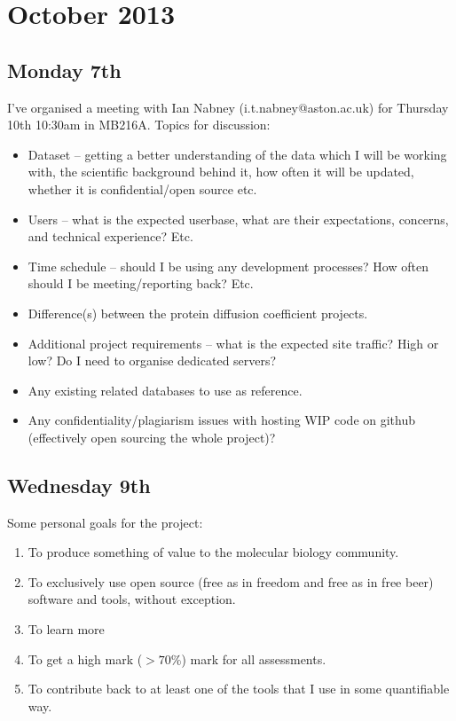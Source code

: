 \section{October 2013 \hrulefill}

\subsection{Monday 7th}
I've organised a meeting with Ian Nabney (i.t.nabney@aston.ac.uk) for Thursday
10th 10:30am in MB216A. Topics for discussion:

\begin{itemize}
\item Dataset – getting a better understanding of the data which I will be
  working with, the scientific background behind it, how often it will be
  updated, whether it is confidential/open source etc.
\item Users – what is the expected userbase, what are their expectations,
  concerns, and technical experience? Etc.
\item Time schedule – should I be using any development processes? How often
  should I be meeting/reporting back? Etc.
\item Difference(s) between the protein diffusion coefficient projects.
\item Additional project requirements – what is the expected site traffic? High
  or low? Do I need to organise dedicated servers?
\item Any existing related databases to use as reference.
\item Any confidentiality/plagiarism issues with hosting WIP code on github
  (effectively open sourcing the whole project)?
\end{itemize}

\subsection{Wednesday 9th}
Some personal goals for the project:

\begin{enumerate}
\item To produce something of value to the molecular biology community.
\item To exclusively use open source (free as in freedom and free as in free
  beer) software and tools, without exception.
\item To learn more
\item To get a high mark ($> 70\%$) mark for all assessments.
\item To contribute back to at least one of the tools that I use in some
  quantifiable way.
\end{enumerate}

